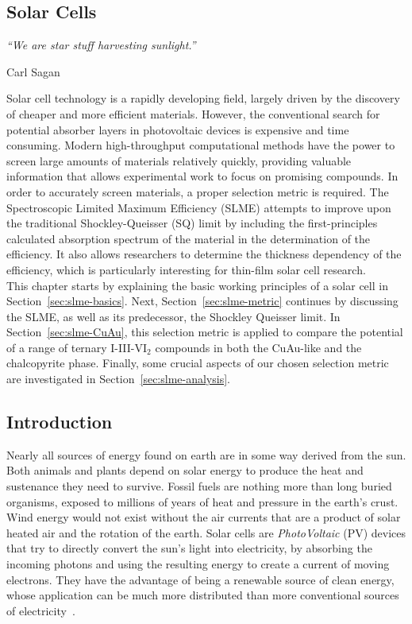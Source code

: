 \begin{refsection} 
 
\chapter{Solar Cells}\label{chapter:solar} 
 
\setlength{\epigraphwidth}{3in} 
\epigraph{\textit{``We are star stuff harvesting sunlight.” }}{Carl Sagan} 
\vspace{3em} 
 
Solar cell technology is a rapidly developing field, largely driven by the 
discovery of cheaper and more efficient materials. However, the conventional 
search for potential absorber layers in photovoltaic devices is expensive and 
time consuming. Modern high-throughput computational methods have the power to 
screen large amounts of materials relatively quickly, providing valuable 
information that allows experimental work to focus on promising compounds. In 
order to accurately screen materials, a proper selection metric is required. 
The Spectroscopic Limited Maximum Efficiency (SLME) attempts to improve upon 
the traditional Shockley-Queisser (SQ) limit by including the first-principles 
calculated absorption spectrum of the material in the determination of the 
efficiency. It also allows researchers to determine the thickness dependency 
of the efficiency, which is particularly interesting for thin-film solar cell 
research. \\ 
 
This chapter starts by explaining the basic working principles of a solar cell 
in Section~\ref{sec:slme-basics}. Next, Section~\ref{sec:slme-metric} 
continues by discussing the SLME, as well as its predecessor, the Shockley 
Queisser limit. In Section~\ref{sec:slme-CuAu}, this selection metric is 
applied to compare the potential of a range of ternary I-III-VI$_2$ compounds 
in both the CuAu-like and the chalcopyrite phase. Finally, some crucial 
aspects of our chosen selection metric are investigated in 
Section~\ref{sec:slme-analysis}. 
 
\pagebreak 
 
\section{Introduction} 
 
Nearly all sources of energy found on earth are in some way derived from the 
sun. Both animals and plants depend on solar energy to produce the heat and 
sustenance they need to survive. Fossil fuels are nothing more than long 
buried organisms, exposed to millions of years of heat and pressure in the 
earth's crust. Wind energy would not exist without the air currents that are a 
product of solar heated air and the rotation of the earth. Solar cells are 
\textit{PhotoVoltaic} (PV) devices that try to directly convert the sun's 
light into electricity, by absorbing the incoming photons and using the 
resulting energy to create a current of moving electrons. They have the 
advantage of being a renewable source of clean energy, whose application can 
be much more distributed than more conventional sources of 
electricity~\cite{Marsden2011}. 
 

\end{refsection}
